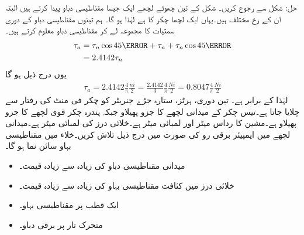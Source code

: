 حل: \quad
شکل   سے رجوع کریں۔ شکل  کے تین چھوٹے لچھے ایک جیسا  مقناطیسی دباو  پیدا کرتے ہیں البتہ ان کے رخ مختلف ہیں۔یہاں ایک لچھا   چکر کا ہے لہٰذا  ہو گا۔ ہم تینوں مقناطیسی دباو کے دوری سمتیات کا مجموعہ لے کر  مقناطیسی دباو  معلوم کرتے ہیں۔
\begin{align*}
\tau_a&=\tau_n \cos 45\degree+\tau_n+\tau_n \cos 45\degree\\
&=2.4142 \tau_n
\end{align*}
یوں درج ذیل ہو گا
\begin{align*}
\tau_a=2.4142 \frac{4}{\pi}\frac{ni}{2}=\frac{2.4142}{3} \frac{4}{\pi}\frac{N i}{2}=0.8047 \frac{4}{\pi}\frac{N i}{2}
\end{align*}
لہٰذا  کے برابر ہے۔
%
تین دوری،  ہرٹز، ستارہ جڑے جنریٹر کو   چکر فی منٹ کی رفتار سے چلایا جاتا ہے۔تیس چکر کے میدانی لچھے  کا جزو پھیلاو  جبکہ پندرہ چکر قوی لچھے کا جزو پھیلاو  ہے۔مشین کا رداس  میٹر اور لمبائی  میٹر ہے۔خلائی درز کی لمبائی  میٹر ہے۔میدانی لچھے میں   ایمپیئر برقی رو کی صورت میں درج ذیل تلاش کریں۔خلاء میں مقناطیسی بہاو سائن نما ہو گا۔ 
\begin{itemize}
\item
میدانی مقناطیسی دباو کی زیادہ سے زیادہ قیمت۔
\item
خلائی درز میں کثافت مقناطیسی بہاو کی زیادہ سے زیادہ قیمت۔
\item
ایک قطب پر مقناطیسی بہاو۔
\item
متحرک تار پر برقی دباو۔
\end{itemize}

